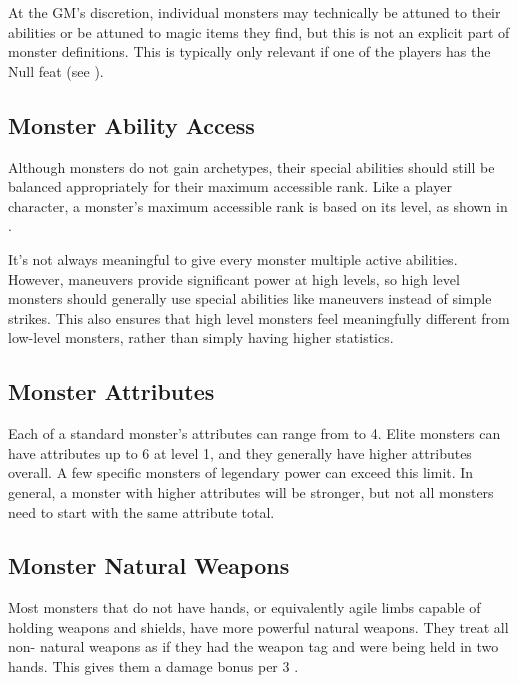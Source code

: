             At the GM's discretion, individual monsters may technically be attuned to their abilities or be attuned to magic items they find, but this is not an explicit part of monster definitions.
            This is typically only relevant if one of the players has the Null feat (see ).

        \subsection{Monster Ability Access}\label{Monster Ability Access}
            Although monsters do not gain archetypes, their special abilities should still be balanced appropriately for their maximum accessible rank.
            Like a player character, a monster's maximum accessible rank is based on its level, as shown in .

            It's not always meaningful to give every monster multiple active abilities.
            However, maneuvers provide significant power at high levels, so high level monsters should generally use special abilities like maneuvers instead of simple strikes.
            This also ensures that high level monsters feel meaningfully different from low-level monsters, rather than simply having higher statistics.

    \subsection{Monster Attributes}\label{Monster Attributes}
        Each of a standard monster's attributes can range from  to 4.
        Elite monsters can have attributes up to 6 at level 1, and they generally have higher attributes overall.
        A few specific monsters of legendary power can exceed this limit.
        In general, a monster with higher attributes will be stronger, but not all monsters need to start with the same attribute total.

    \subsection{Monster Natural Weapons}\label{Monster Natural Weapon}
        Most monsters that do not have hands, or equivalently agile limbs capable of holding weapons and shields, have more powerful natural weapons.
        They treat all non- natural weapons as if they had the  weapon tag and were being held in two hands.
        This gives them a  damage bonus per 3 .

